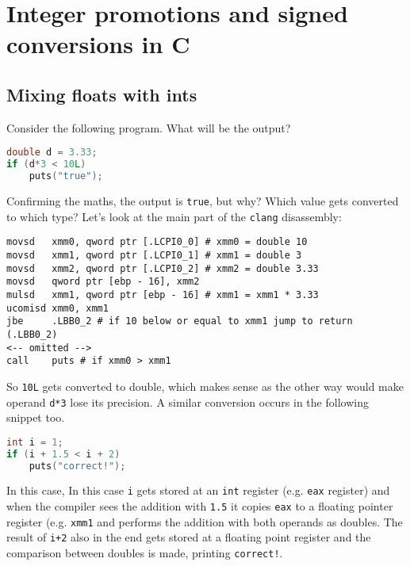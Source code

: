 \section{Integer promotions and signed conversions in C}


\subsection{Mixing floats with ints}

Consider the following program. What will be the output?
\begin{lstlisting}[language=c]
double d = 3.33;
if (d*3 < 10L)
	puts("true");
\end{lstlisting}
Confirming the maths, the output is \texttt{true}, but why? Which value gets converted to which type? Let's look at the main part of the \texttt{clang} disassembly:
\begin{lstlisting}
movsd   xmm0, qword ptr [.LCPI0_0] # xmm0 = double 10
movsd   xmm1, qword ptr [.LCPI0_1] # xmm1 = double 3
movsd   xmm2, qword ptr [.LCPI0_2] # xmm2 = double 3.33
movsd   qword ptr [ebp - 16], xmm2
mulsd   xmm1, qword ptr [ebp - 16] # xmm1 = xmm1 * 3.33
ucomisd xmm0, xmm1
jbe     .LBB0_2 # if 10 below or equal to xmm1 jump to return (.LBB0_2)
<-- omitted -->
call    puts # if xmm0 > xmm1    
\end{lstlisting}
So \texttt{10L} gets converted to double, which makes sense as the other way would make operand \texttt{d*3} lose its precision. A similar conversion occurs in the following snippet too.
\begin{lstlisting}[language=c]
int i = 1;
if (i + 1.5 < i + 2)
	puts("correct!");
\end{lstlisting}
In this case, In this case \texttt{i} gets stored at an \texttt{int} register (e.g. \texttt{eax} register) and when the compiler sees the addition with \texttt{1.5} it copies \texttt{eax} to a floating pointer register (e.g. \texttt{xmm1} and performs the addition with both operands as doubles. The result of \texttt{i+2} also in the end gets stored at a floating point register and the comparison between doubles is made, printing \texttt{correct!}.

